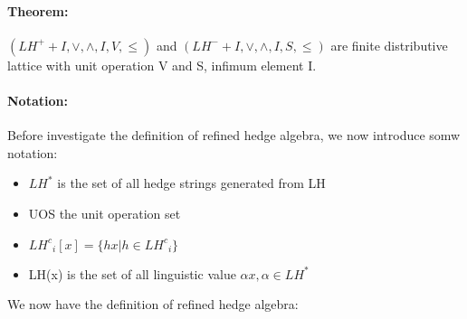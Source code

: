 \documentclass[26pt,fleqn,]{article}
\begin{document}
\paragraph{Theorem: } \((LH^+ + I, \vee, \wedge,I,V,\le)\) and \((LH^- + I, \vee, \wedge,I,S,\le)\)
are finite distributive lattice  with unit operation V and S, infimum element I.\\
\paragraph{Notation: } Before investigate the definition of refined hedge algebra, we now introduce
somw notation: \\
\begin{itemize}
	\item \(LH^*\) is the set of all hedge strings generated from LH
	\item UOS the unit operation set
	\item \({LH^c}_i[x] = \{hx|h \in {LH^c}_i\}\)
	\item LH(x) is the set of all linguistic value \(\alpha x, \alpha \in LH^*\)
\end{itemize}
We now have the definition of refined hedge algebra:\\\\
\end{document}

